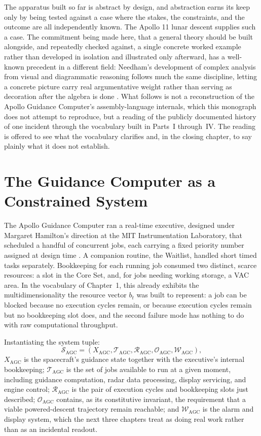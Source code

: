 \documentclass[11pt]{report}
\begin{document}
The apparatus built so far is abstract by design, and abstraction earns its keep only by being tested against a case where the stakes, the constraints, and the outcome are all independently known. The Apollo 11 lunar descent supplies such a case. The commitment being made here, that a general theory should be built alongside, and repeatedly checked against, a single concrete worked example rather than developed in isolation and illustrated only afterward, has a well-known precedent in a different field: Needham's development of complex analysis from visual and diagrammatic reasoning follows much the same discipline, letting a concrete picture carry real argumentative weight rather than serving as decoration after the algebra is done \cite{needham1997}. What follows is not a reconstruction of the Apollo Guidance Computer's assembly-language internals, which this monograph does not attempt to reproduce, but a reading of the publicly documented history of one incident through the vocabulary built in Parts~I through~IV. The reading is offered to see what the vocabulary clarifies and, in the closing chapter, to say plainly what it does not establish.

\chapter{The Guidance Computer as a Constrained System}

The Apollo Guidance Computer ran a real-time executive, designed under Margaret Hamilton's direction at the MIT Instrumentation Laboratory, that scheduled a handful of concurrent jobs, each carrying a fixed priority number assigned at design time \cite{hoag1976,hall1996}. A companion routine, the Waitlist, handled short timed tasks separately. Bookkeeping for each running job consumed two distinct, scarce resources: a slot in the Core Set, and, for jobs needing working storage, a VAC area. In the vocabulary of Chapter~1, this already exhibits the multidimensionality the resource vector $b_t$ was built to represent: a job can be blocked because no execution cycles remain, or because execution cycles remain but no bookkeeping slot does, and the second failure mode has nothing to do with raw computational throughput.

Instantiating the system tuple:
\[
\mathcal S_{\mathrm{AGC}} = (X_{\mathrm{AGC}}, \mathcal T_{\mathrm{AGC}}, \mathcal R_{\mathrm{AGC}}, \mathcal O_{\mathrm{AGC}}, \mathcal W_{\mathrm{AGC}}),
\]
$X_{\mathrm{AGC}}$ is the spacecraft's guidance state together with the executive's internal bookkeeping; $\mathcal T_{\mathrm{AGC}}$ is the set of jobs available to run at a given moment, including guidance computation, radar data processing, display servicing, and engine control; $\mathcal R_{\mathrm{AGC}}$ is the pair of execution cycles and bookkeeping slots just described; $\mathcal O_{\mathrm{AGC}}$ contains, as its constitutive invariant, the requirement that a viable powered-descent trajectory remain reachable; and $\mathcal W_{\mathrm{AGC}}$ is the alarm and display system, which the next three chapters treat as doing real work rather than as an incidental readout.
\end{document}
